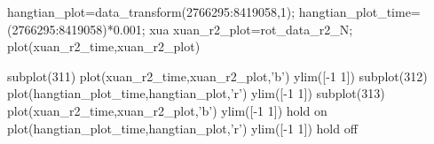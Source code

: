 hangtian_plot=data_transform(2766295:8419058,1);
hangtian_plot_time=(2766295:8419058)*0.001;
xua
xuan_r2_plot=rot_data_r2_N;
plot(xuan_r2_time,xuan_r2_plot)



subplot(311)
plot(xuan_r2_time,xuan_r2_plot,'b')
ylim([-1 1])
subplot(312)
plot(hangtian_plot_time,hangtian_plot,'r')
ylim([-1 1])
subplot(313)
plot(xuan_r2_time,xuan_r2_plot,'b')
ylim([-1 1])
hold on
plot(hangtian_plot_time,hangtian_plot,'r')
ylim([-1 1])
hold off